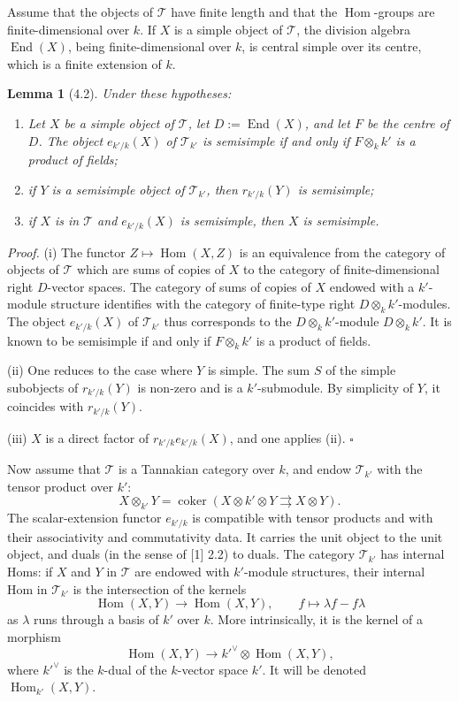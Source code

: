 \documentclass[10pt]{article}
\newcommand{\End}{\operatorname{End}}
\newcommand{\Hom}{\operatorname{Hom}}
\newcommand{\T}{\mathcal T}
\theoremstyle{deligne}
\newtheorem*{lemma*}{Lemma}
\newenvironment{proofdel}{\textit{Proof.}}{\hfill$\square$}
\newcommand{\heading}[1]{\vspace{0.7em}\noindent{\bfseries #1}\quad}
\begin{document}
Assume that the objects of \(\T\) have finite length and that the \(\Hom\)-groups are finite-dimensional over \(k\). If \(X\) is a simple object of \(\T\), the division algebra \(\End(X)\), being finite-dimensional over \(k\), is central simple over its centre, which is a finite extension of \(k\).

\begin{lemma*}[4.2]
Under these hypotheses:
\begin{enumerate}[label=(\roman*)]
\item Let \(X\) be a simple object of \(\T\), let \(D:=\End(X)\), and let \(F\) be the centre of \(D\). The object \(e_{k'/k}(X)\) of \(\T_{k'}\) is semisimple if and only if \(F\otimes_k k'\) is a product of fields;
\item if \(Y\) is a semisimple object of \(\T_{k'}\), then \(r_{k'/k}(Y)\) is semisimple;
\item if \(X\) is in \(\T\) and \(e_{k'/k}(X)\) is semisimple, then \(X\) is semisimple.
\end{enumerate}
\end{lemma*}

\begin{proofdel}
(i) The functor \(Z\mapsto \Hom(X,Z)\) is an equivalence from the category of objects of \(\T\) which are sums of copies of \(X\) to the category of finite-dimensional right \(D\)-vector spaces. The category of sums of copies of \(X\) endowed with a \(k'\)-module structure identifies with the category of finite-type right \(D\otimes_k k'\)-modules. The object \(e_{k'/k}(X)\) of \(\T_{k'}\) thus corresponds to the \(D\otimes_k k'\)-module \(D\otimes_k k'\). It is known to be semisimple if and only if \(F\otimes_k k'\) is a product of fields.

(ii) One reduces to the case where \(Y\) is simple. The sum \(S\) of the simple subobjects of \(r_{k'/k}(Y)\) is non-zero and is a \(k'\)-submodule. By simplicity of \(Y\), it coincides with \(r_{k'/k}(Y)\).

(iii) \(X\) is a direct factor of \(r_{k'/k}e_{k'/k}(X)\), and one applies (ii).
\end{proofdel}

\heading{4.3.}
Now assume that \(\T\) is a Tannakian category over \(k\), and endow \(\T_{k'}\) with the tensor product over \(k'\):
\[
X\otimes_{k'}Y=\operatorname{coker}(X\otimes k'\otimes Y\rightrightarrows X\otimes Y).
\]
The scalar-extension functor \(e_{k'/k}\) is compatible with tensor products and with their associativity and commutativity data. It carries the unit object to the unit object, and duals (in the sense of [1] 2.2) to duals. The category \(\T_{k'}\) has internal Homs: if \(X\) and \(Y\) in \(\T\) are endowed with \(k'\)-module structures, their internal Hom in \(\T_{k'}\) is the intersection of the kernels
\[
\Hom(X,Y)\longrightarrow \Hom(X,Y),\qquad
f\longmapsto \lambda f-f\lambda
\]
as \(\lambda\) runs through a basis of \(k'\) over \(k\). More intrinsically, it is the kernel of a morphism
\[
\Hom(X,Y)\longrightarrow k'^{\vee}\otimes \Hom(X,Y),
\]
where \(k'^{\vee}\) is the \(k\)-dual of the \(k\)-vector space \(k'\). It will be denoted \(\Hom_{k'}(X,Y)\).
\end{document}
